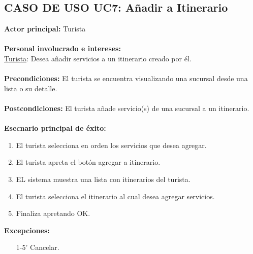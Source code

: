 \documentclass[12pt]{article}
\begin{document}
\subsection*{\textbf{CASO DE USO UC7:} Añadir a Itinerario }
\textbf{Actor principal:} Turista\\
\\
\textbf{Personal involucrado e intereses: }\\
\underline{Turista}: Desea añadir servicios a un itinerario creado por él.
\\\\
\textbf{Precondiciones:} El turista se encuentra visualizando una sucursal desde una lista o su detalle.\\
\\
\textbf{Postcondiciones:} El turista añade servicio(s) de una sucursal a un itinerario.\\
\\
\textbf{Esecnario principal de éxito:}
\begin{enumerate}
\item El turista selecciona en orden los servicios que desea agregar.
\item El turista apreta el botón agregar a itinerario.
\item EL sistema muestra una lista con itinerarios del turista.
\item El turista selecciona el itinerario al cual desea agregar servicios.
\item Finaliza apretando OK.
\end{enumerate}
\textbf{Excepciones:}
\begin{enumerate}
\item[1-5'] Cancelar.
\end{enumerate}
\end{document}
